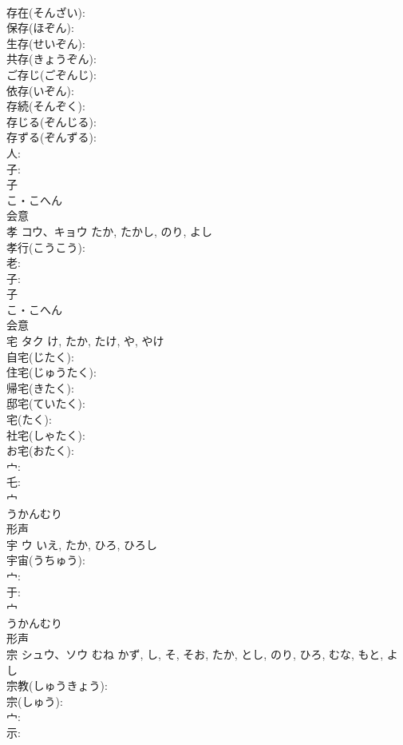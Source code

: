 \documentclass[8pt]{extreport}
\begin{document}
\begin{CJK}{UTF8}{min}
\\	存在(そんざい): 
\\	保存(ほぞん): 
\\	生存(せいぞん): 
\\	共存(きょうぞん): 
\\	ご存じ(ごぞんじ): 
\\	依存(いぞん): 
\\	存続(そんぞく): 
\\	存じる(ぞんじる): 
\\	存ずる(ぞんずる): 
\\	人: 
\\	子: 
\\	子	
\\	こ・こへん	
\\	会意 
\\	孝	コウ、キョウ		たか, たかし, のり, よし	
\\	孝行(こうこう): 
\\	老: 
\\	子: 
\\	子	
\\	こ・こへん	
\\	会意 
\\	宅	タク		け, たか, たけ, や, やけ	
\\	自宅(じたく): 
\\	住宅(じゅうたく): 
\\	帰宅(きたく): 
\\	邸宅(ていたく): 
\\	宅(たく): 
\\	社宅(しゃたく): 
\\	お宅(おたく): 
\\	宀: 
\\	乇: 
\\	宀	
\\	うかんむり	
\\	形声 
\\	宇	ウ		いえ, たか, ひろ, ひろし	
\\	宇宙(うちゅう): 
\\	宀: 
\\	于: 
\\	宀	
\\	うかんむり	
\\	形声 
\\	宗	シュウ、ソウ	むね	かず, し, そ, そお, たか, とし, のり, ひろ, むな, もと, よし	
\\	宗教(しゅうきょう): 
\\	宗(しゅう): 
\\	宀: 
\\	示: 

\end{CJK}
\end{document}

